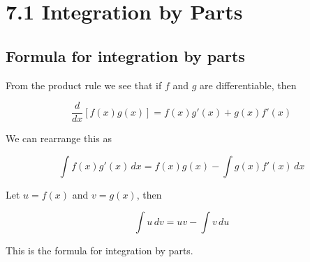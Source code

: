 %
%

\section*{7.1 Integration by Parts}

\subsection*{Formula for integration by parts}

\begin{definition}

From the product rule we see that if $f$ and $g$ are differentiable, then

\[ \frac{d}{dx}[f(x)g(x)] = f(x)g'(x) + g(x)f'(x) \]

We can rearrange this as

\[ \int \! f(x)g'(x) \, dx = f(x)g(x) - \int \! g(x)f'(x) \, dx \]

Let $u = f(x)$ and $v = g(x)$, then

\[ \int \! u \, dv = uv - \int \! v \, du \]

This is the formula for integration by parts.

\end{definition}
